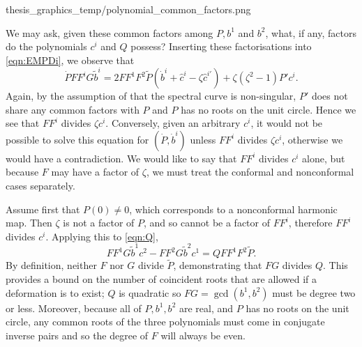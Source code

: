 {thesis_graphics_temp/polynomial_common_factors.png}

We may ask, given these common factors among $P, b^1$ and $b^2$, what, if any, factors do the polynomials $c^i$ and $Q$ possess? Inserting these factorisations into \eqref{eqn:EMPDi}, we observe that
\[
\dot{P} F F^i G \tilde{b}^i = 2 F F^1 F^2 \tilde{P} (\dot{b}^i + \hat{c}^i - ζ\hat{c}^{i\prime}) + ζ(ζ^2-1 ) P'c^i.
\]
Again, by the assumption of that the spectral curve is non-singular, $P'$ does not share any common factors with $P$ and $P$ has no roots on the unit circle. Hence we see that $FF^i$ divides $ζc^i$. Conversely, given an arbitrary $c^i$, it would not be possible to solve this equation for $(\dot{P},\dot{b}^i)$ unless $FF^i$ divides $ζc^i$, otherwise we would have a contradiction. We would like to say that $FF^i$ divides $c^i$ alone, but because $F$ may have a factor of $ζ$, we must treat the conformal and nonconformal cases separately.

Assume first that $P(0)\neq 0$, which corresponds to a nonconformal harmonic map. Then $ζ$ is not a factor of $P$, and so cannot be a factor of $FF^i$, therefore $FF^i$ divides $c^i$. Applying this to \eqref{eqn:Q},
\[
FF^1G\tilde{b}^1 c^2 - FF^2G\tilde{b}^2 c^1 = Q FF^1F^2\tilde{P}.
\]
By definition, neither $F$ nor $G$ divide $\tilde{P}$, demonstrating that $FG$ divides $Q$. This provides a bound on the number of coincident roots that are allowed if a deformation is to exist; $Q$ is quadratic so $FG = \gcd(b^1,b^2)$ must be degree two or less. Moreover, because all of $P,b^1,b^2$ are real, and $P$ has no roots on the unit circle, any common roots of the three polynomials must come in conjugate inverse pairs and so the degree of $F$ will always be even.

